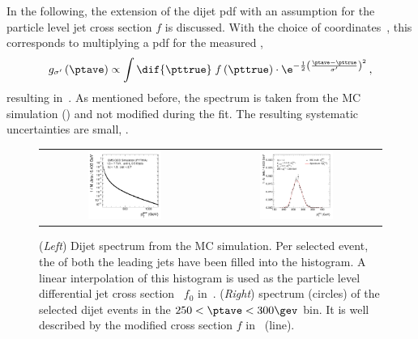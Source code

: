 In the following, the extension of the dijet pdf with an assumption for the particle level jet \pt cross section $f$ is discussed.
With the choice of coordinates~, this corresponds to multiplying a pdf for the measured \ptave,
\begin{equation*}
 g_{\sigma'}\left(\ptave\right) \propto
  \int\dif{\pttrue}\;f\left(\pttrue\right)\cdot
  \e^{-\frac{1}{2}\left(\frac{\ptave - \pttrue}{\sigma'}\right)^{2}} \, , 
\end{equation*}
resulting in~.
As mentioned before, the spectrum is taken from the MC simulation () and not modified during the fit.
The resulting systematic uncertainties are small, .

\begin{figure}[ht]
 \centering
  \begin{tabular}{cc}
    \includegraphics[width=0.45\textwidth]{figures/ExampleSpectrum} &
    \includegraphics[width=0.45\textwidth]{figures/MaxLike_Eta00-13_SpectrumJet1_PtBin7}\\
 \end{tabular}
  \caption{(\textit{Left}) Dijet \ptgen spectrum from the MC simulation.
    Per selected event, the \ptgen of both the leading jets have been filled into the histogram.
    A linear interpolation of this histogram is used as the particle
    level differential jet cross section~ $f_{0}$ in~.
    (\textit{Right}) \ptgen spectrum (circles) of the selected dijet events in the \mbox{$250 < \ptave < 300\gev$} bin.
    It is well described by the modified cross section $f$ in~ (line).}
  \label{fig:ResFit:DataDriven:Spectrum}
\end{figure}

